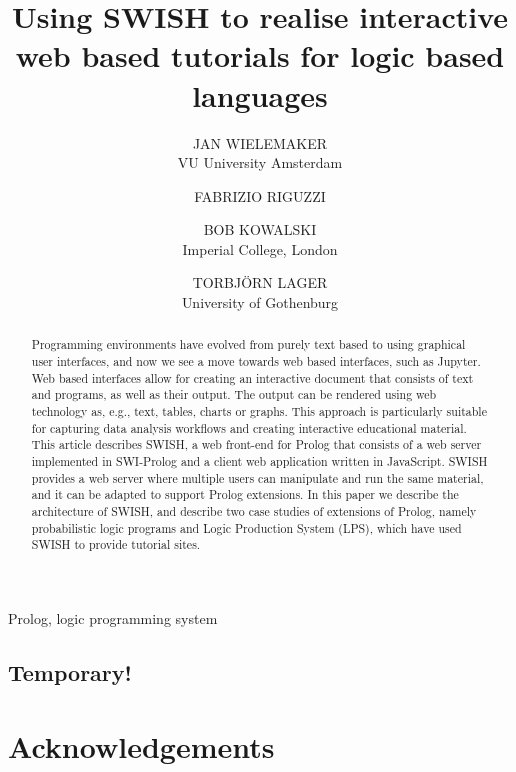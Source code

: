 \documentclass{tlp}
\begin{document}


\title{Using SWISH to realise interactive web based tutorials for
       logic based languages}

\author[J. Wielemaker et al.]
{JAN WIELEMAKER \\
VU University Amsterdam\\
\and
 FABRIZIO RIGUZZI \\
\and
BOB KOWALSKI \\
Imperial College, London\\
\and
TORBJ\"ORN LAGER \\
University of Gothenburg\\
}

\pagerange{\pageref{firstpage}--\pageref{lastpage}}
\setcounter{page}{1}

\maketitle
\begin{abstract}
Programming environments have evolved from purely text based to using
graphical user interfaces, and now we see a move towards web based
interfaces, such as Jupyter. Web based interfaces allow for creating an
interactive document that consists of text and programs, as well as
their output. The output can be rendered using web technology as, e.g.,
text, tables, charts or graphs. This approach is particularly suitable
for capturing data analysis workflows and creating interactive
educational material. This article describes SWISH, a web front-end for
Prolog that consists of a web server implemented in SWI-Prolog and a
client web application written in JavaScript. SWISH provides a web
server where multiple users can manipulate and run the same material,
and it can be adapted to support Prolog extensions. In this paper we
describe the architecture of SWISH, and describe two case studies of
extensions of Prolog, namely probabilistic logic programs and Logic
Production System (LPS), which have used SWISH to provide tutorial
sites.
\end{abstract}


\begin{keywords}
Prolog, logic programming system
\end{keywords}

\newpage
\subsection*{Temporary!}
\tableofcontents
\newpage









\section*{Acknowledgements}


\end{document}
